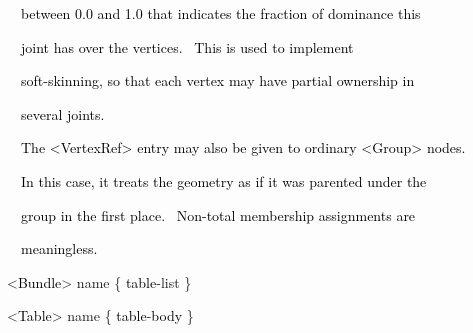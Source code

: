 \documentclass[a4paper]{article}
\newcommand\textstyleOOoComputerKeyWord[1]{\textrm{\textcolor[rgb]{0.0,0.0,0.5019608}{#1}}}
\newcommand\textstyleOOoAssemblerSpecialChar[1]{\textrm{\textcolor[rgb]{0.0,0.5019608,0.0}{#1}}}
\newcommand\textstyleOOoAssemblerIdent[1]{\textrm{\textcolor{black}{#1}}}
\newcommand\textstyleOOoAssemblerDirective[1]{\textrm{\textcolor[rgb]{0.0,0.5019608,1.0}{#1}}}
\begin{document}
{\color{black}
\textstyleOOoComputerKeyWord{\textcolor{black}{\ \ between 0.0 and 1.0 that indicates the fraction of dominance this}}}

{\color{black}
\textstyleOOoComputerKeyWord{\textcolor{black}{\ \ joint has over the vertices. \ This is used to implement}}}

{\color{black}
\textstyleOOoComputerKeyWord{\textcolor{black}{\ \ soft-skinning, so that each vertex may have partial ownership in}}}

{\color{black}
\textstyleOOoComputerKeyWord{\textcolor{black}{\ \ several joints.}}}

{\color{black}
\textstyleOOoComputerKeyWord{\textcolor{black}{\ \ The {\textless}VertexRef{\textgreater} entry may also be given to
ordinary {\textless}Group{\textgreater} nodes.}}}

{\color{black}
\textstyleOOoComputerKeyWord{\textcolor{black}{\ \ In this case, it treats the geometry as if it was parented under
the}}}

{\color{black}
\textstyleOOoComputerKeyWord{\textcolor{black}{\ \ group in the first place. \ Non-total membership assignments are}}}

{\color{black}
\textstyleOOoComputerKeyWord{\textcolor{black}{\ \ meaningless.}}}


\bigskip

{\color{black}
\textstyleOOoAssemblerSpecialChar{{\textless}}\textstyleOOoAssemblerIdent{Bundle}\textstyleOOoAssemblerSpecialChar{{\textgreater}}\textstyleOOoComputerKeyWord{\textcolor{black}{
}}\textstyleOOoAssemblerDirective{name}\textstyleOOoComputerKeyWord{\textcolor{black}{
}}\textstyleOOoAssemblerSpecialChar{\{}\textstyleOOoComputerKeyWord{\textcolor{black}{
}}\textstyleOOoAssemblerIdent{table}\textstyleOOoAssemblerSpecialChar{{}-}\textstyleOOoAssemblerDirective{list}\textstyleOOoComputerKeyWord{\textcolor{black}{
}}\textstyleOOoAssemblerSpecialChar{\}}}

{\color{black}
\textstyleOOoAssemblerSpecialChar{{\textless}}\textstyleOOoAssemblerIdent{Table}\textstyleOOoAssemblerSpecialChar{{\textgreater}}\textstyleOOoComputerKeyWord{\textcolor{black}{
}}\textstyleOOoAssemblerDirective{name}\textstyleOOoComputerKeyWord{\textcolor{black}{
}}\textstyleOOoAssemblerSpecialChar{\{}\textstyleOOoComputerKeyWord{\textcolor{black}{
}}\textstyleOOoAssemblerIdent{table}\textstyleOOoAssemblerSpecialChar{{}-}\textstyleOOoAssemblerIdent{body}\textstyleOOoComputerKeyWord{\textcolor{black}{
}}\textstyleOOoAssemblerSpecialChar{\}}}
\end{document}

